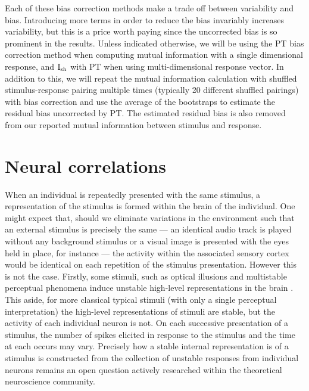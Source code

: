 Each of these bias correction methods make a trade off between variability and bias.
Introducing more terms in order to reduce the bias invariably increases variability, but this is a price worth paying since the uncorrected bias is so prominent in the results.
Unless indicated otherwise, we will be using the \ac{PT} bias correction method when computing mutual information with a single dimensional response, and $\operatorname{I}_{\text{sh}}$ with \ac{PT} when using multi-dimensional response vector.
In addition to this, we will repeat the mutual information calculation with shuffled stimulus-response pairing multiple times (typically 20 different shuffled pairings) with bias correction and use the average of the bootstraps to estimate the residual bias uncorrected by \ac{PT}.
The estimated residual bias is also removed from our reported mutual information between stimulus and response.


\section{Neural correlations}
\label{sec:bg-corr}

When an individual is repeatedly presented with the same stimulus, a representation of the stimulus is formed within the brain of the individual.
One might expect that, should we eliminate variations in the environment such that an external stimulus is precisely the same --- an identical audio track is played without any background stimulus or a visual image is presented with the eyes held in place, for instance --- the activity within the associated sensory cortex would be identical on each repetition of the stimulus presentation.
However this is not the case.
Firstly, some stimuli, such as optical illusions and multistable perceptual phenomena induce unstable high-level representations in the brain \citep{Lumer1998,Sterzer2009,Watanabe2014}.
This aside, for more classical typical stimuli (with only a single perceptual interpretation) the high-level representations of stimuli are stable, but the activity of each individual neuron is not.
On each successive presentation of a stimulus, the number of spikes elicited in response to the stimulus and the time at each occurs may vary.
Precisely how a stable internal representation is of a stimulus is constructed from the collection of unstable responses from individual neurons remains an open question actively researched within the theoretical neuroscience community.

